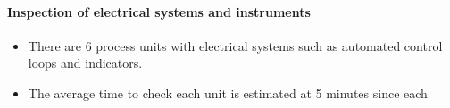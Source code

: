 \paragraph{Inspection of electrical systems and instruments}
    \begin{itemize}
        \item There are 6 process units with electrical systems such as automated control loops and indicators.
        \item The average time to check each unit is estimated at 5 minutes since each 
    \end{itemize}